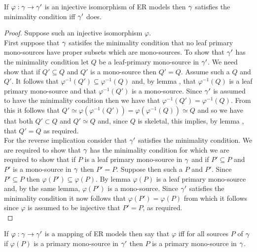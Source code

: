 \begin{lemma}
If $\varphi: \gamma \rightarrow \gamma'$ is an injective isomorphism of ER models then $\gamma$ satisfies the minimality condition iff $\gamma'$ does.
\end{lemma}
\begin{proof}
Suppose such an injective isomorphism $\varphi$. \\

First suppose that $\gamma$ satisifes the minimality condition that no leaf primary mono-sources have proper subsets which are mono-sources. 
To show that $\gamma'$ has the minimality condition let $Q$ be a leaf-primary mono-source in $\gamma'$. We need show that if $Q' \subseteq Q$ and $Q'$ is a mono-source then $Q'=Q$. Assume such a $Q$ and $Q'$. It follows that $\varphi^{-1}(Q') \subseteq \varphi^{-1} (Q)$ and, by lemma , that $\varphi^{-1}(Q)$
is a leaf primary mono-source and that $\varphi^{-1}(Q')$ is a mono-source. Since $\gamma'$ is assumed to have the minimality condition then we have that
$\varphi^{-1}(Q') = \varphi^{-1} (Q)$. From this it follows that  $Q' \simeq \varphi(\varphi^{-1}(Q')) = \varphi(\varphi^{-1}(Q)) \simeq Q$ and so we have that both $Q' \subset Q$ and $Q' \simeq Q$ and, since $Q$ is skeletal, this implies, by lemma , that $Q'=Q$ as required. \\

For the reverse implication consider that $\gamma'$ satisfies the minimality condition. We are required to show that $\gamma$ has the minimality condition for which we are required to show that if  $P$ is a leaf primary mono-source in $\gamma$ and if $P' \subseteq P$ and 
 $P'$ is a mono-source in $\gamma$ then $P'=P$.  Suppose then such a $P$ and $P'$. Since $P' \subseteq P$ then $\varphi(P') \subseteq \varphi(P)$. 
By lemma  $\varphi(P)$ is a leaf primary mono-source and, by the same lemma,  $\varphi(P')$ is a mono-source.
Since $\gamma'$ satisfies the minimality condition it now follows that $\varphi(P') = \varphi(P)$ from which  it follows since $\varphi$ is assumed to be injective
that $P'=P$, as required.\\
\end{proof}

\begin{definition}
If $\varphi: \gamma \rightarrow \gamma'$ is a mapping of ER models then
say that $\varphi$  
iff for all sources $P$ of  $\gamma$ if
$\varphi(P)$ is a primary mono-source in $\gamma'$ then $P$ is a primary mono-source in $\gamma$.
\end{definition}

